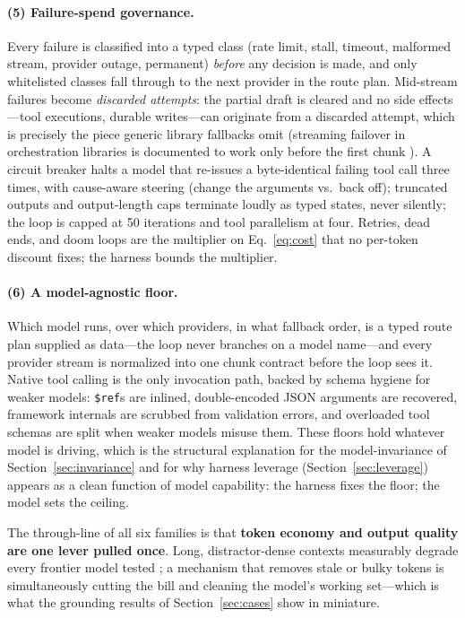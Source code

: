 \documentclass[11pt]{article}
\begin{document}
\paragraph{(5) Failure-spend governance.}
Every failure is classified into a typed class (rate limit, stall, timeout, malformed stream, provider outage, permanent) \emph{before} any decision is made, and only whitelisted classes fall through to the next provider in the route plan. Mid-stream failures become \emph{discarded attempts}: the partial draft is cleared and no side effects---tool executions, durable writes---can originate from a discarded attempt, which is precisely the piece generic library fallbacks omit (streaming failover in orchestration libraries is documented to work only before the first chunk \cite{langgraph}). A circuit breaker halts a model that re-issues a byte-identical failing tool call three times, with cause-aware steering (change the arguments vs.\ back off); truncated outputs and output-length caps terminate loudly as typed states, never silently; the loop is capped at 50 iterations and tool parallelism at four. Retries, dead ends, and doom loops are the multiplier on Eq.~\eqref{eq:cost} that no per-token discount fixes; the harness bounds the multiplier.

\paragraph{(6) A model-agnostic floor.}
Which model runs, over which providers, in what fallback order, is a typed route plan supplied as data---the loop never branches on a model name---and every provider stream is normalized into one chunk contract before the loop sees it. Native tool calling is the only invocation path, backed by schema hygiene for weaker models: \texttt{\$ref}s are inlined, double-encoded JSON arguments are recovered, framework internals are scrubbed from validation errors, and overloaded tool schemas are split when weaker models misuse them. These floors hold whatever model is driving, which is the structural explanation for the model-invariance of Section~\ref{sec:invariance} and for why harness leverage (Section~\ref{sec:leverage}) appears as a clean function of model capability: the harness fixes the floor; the model sets the ceiling.

The through-line of all six families is that \textbf{token economy and output quality are one lever pulled once}. Long, distractor-dense contexts measurably degrade every frontier model tested \cite{contextrot,lost}; a mechanism that removes stale or bulky tokens is simultaneously cutting the bill and cleaning the model's working set---which is what the grounding results of Section~\ref{sec:cases} show in miniature.
\end{document}

